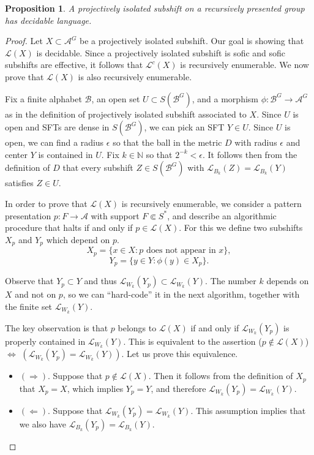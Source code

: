 \documentclass[10pt,a4paper]{amsart}
\newtheorem{proposition}{Proposition}
\newcommand{\A}{\mathcal{A}}
\newcommand{\B}{\mathcal{B}}
\newcommand{\Le}{\mathcal{L}}
\newcommand{\Lep}{\mathscr{L}}
\newcommand{\N}{\mathbb{N}}
\begin{document}
\begin{proposition}\label{prop:projectively-isolated-decidable-language}
A projectively isolated subshift on a recursively presented group has decidable language. 
\end{proposition}

\begin{proof}
    Let $X\subset \A^G$ be a projectively isolated subshift. Our goal is showing that $\Lep(X)$ is decidable. Since a projectively isolated subshift is sofic and sofic subshifts are effective, it follows that $\Lep^c(X)$ is recursively enumerable. We now prove that $\Lep(X)$ is also recursively enumerable. 

    

    Fix a finite alphabet $\B$, an open set $U\subset S(\B^G)$, and a morphism $\phi\colon \B^G\to \A^G$ as in the definition of projectively isolated subshift associated to $X$. Since $U$ is open and SFTs are dense in $S(\B^G)$, we can pick an SFT $Y\in U$. Since $U$ is open, we can find a radius $\epsilon$ so that the ball in the metric $D$ with radius $\epsilon$ and center $Y$ is contained in $U$. Fix $k\in\N$ so that $2^{-k}<\epsilon$. It follows then from the definition of $D$ that every subshift $Z\in S(\B^G)$ with $\Le_{B_k}(Z)=\Le_{B_k}(Y)$ satisfies $Z\in U$. 

    In order to prove that $\Lep(X)$ is recursively enumerable, we consider a pattern presentation $p\colon F\to \A$ with support $F\Subset S^\ast$, and describe an algorithmic procedure that halts if and only if $p\in\Lep(X)$. For this we define two subshifts $X_p$ and $Y_p$ which depend on $p$.
    \[X_p=\{x\in X : \text{$p$ does not appear in $x$}\},\] 
    \[Y_p=\{y \in Y : \phi(y)\in X_p\}.\]
    
    Observe that $Y_p\subset Y$ and thus $\Lep_{W_k}(Y_p)\subset \Lep_{W_k}(Y)$. The number $k$ depends on $X$ and not on $p$, so we can ``hard-code'' it in the next algorithm, together with the finite set $\Lep_{W_k}(Y)$. 
    
    The key observation is that $p$ belongs to $\Lep(X)$ if and only if $\Lep_{W_k}(Y_p)$ is properly contained in $\Lep_{W_k}(Y)$. This is equivalent to the assertion ($p\not\in\Lep(X)$) $\iff$ $(\Lep_{W_k}(Y_p)=\Lep_{W_k}(Y))$. Let us prove this equivalence. 
    \begin{itemize}
        \item $(\Rightarrow)$. Suppose that $p\not\in\Lep(X)$. Then it follows from the definition of $X_p$ that $X_p=X$, which implies $Y_p=Y$, and therefore $\Lep_{W_k}(Y_p)=\Lep_{W_k}(Y)$. 
        \item $(\Leftarrow)$. Suppose that $\Lep_{W_k}(Y_p)=\Lep_{W_k}(Y)$. This assumption implies that we also have $\Le_{B_k}(Y_p)=\Le_{B_k}(Y)$.


\end{itemize}
\end{proof}
\end{document}

